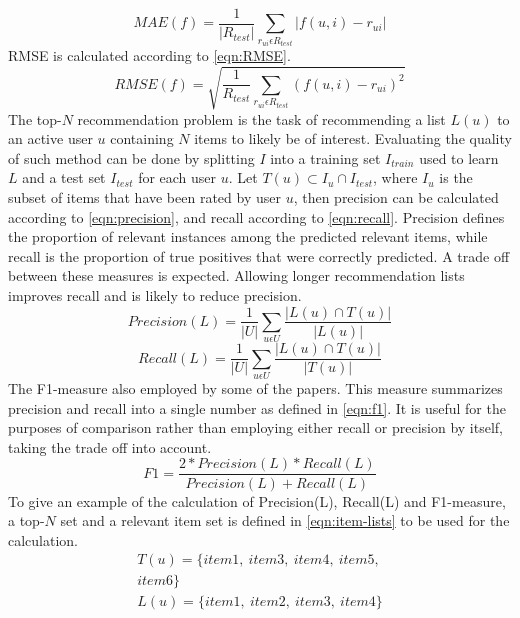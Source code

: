 \begin{equation}
    \label{eqn:MAE}
    MAE(f) = \frac{1}{|R_{test}|} \sum\limits_{r_{ui} \epsilon R_{test}} |f(u,i)-r_{ui}|
\end{equation}
RMSE is calculated according to \autoref{eqn:RMSE}.
\begin{equation}
    \label{eqn:RMSE}
    RMSE(f) = \sqrt{\frac{1}{R_{test}} \sum\limits_{r_{ui} \epsilon R_{test}} (f(u, i) - r_{ui})^2}
\end{equation}
The top-$N$ recommendation problem is the task of recommending a list $L(u)$ to an active user $u$ containing $N$ items to likely be of interest.
Evaluating the quality of such method can be done by splitting $I$ into a training set $I_{train}$ used to learn $L$ and a test set $I_{test}$ for each user $u$.
Let $T(u) \subset I_u \cap I_{test}$, where $I_u$ is the subset of items that have been rated by user $u$, then precision can be calculated according to \autoref{eqn:precision}, and recall according to \autoref{eqn:recall}.
Precision defines the proportion of relevant instances among the predicted relevant items, while recall is the proportion of true positives that were correctly predicted.
A trade off between these measures is expected.
Allowing longer recommendation lists improves recall and is likely to reduce precision\cite{RecommenderHandbook2015}.
\begin{equation}
    \label{eqn:precision}
    Precision(L) = \frac{1}{|U|} \sum\limits_{u \epsilon U}\frac{|L(u) \cap T(u)|}{|L(u)|}
\end{equation}
\begin{equation}
    \label{eqn:recall}
    Recall(L) = \frac{1}{|U|} \sum\limits_{u \epsilon U} \frac{|L(u) \cap T(u)|}{|T(u)|}
\end{equation}
The F1-measure also employed by some of the papers.
This measure summarizes precision and recall into a single number as defined in \autoref{eqn:f1}.
It is useful for the purposes of comparison rather than employing either recall or precision by itself, taking the trade off into account.
\begin{equation}
    \label{eqn:f1}
    F1 = \frac{2*Precision(L)*Recall(L)}{Precision(L)+Recall(L)}
\end{equation}
To give an example of the calculation of Precision(L), Recall(L) and F1-measure, a top-$N$ set and a relevant item set is defined in \autoref{eqn:item-lists} to be used for the calculation.
\begin{align}
    T(u) = \{item1, \: item3, \: item4, \: item5,\nonumber \\
     item6\} \nonumber \\
    L(u) = \{item1, \: item2, \: item3, \: item4\}\label{eqn:item-lists}
\end{align}
